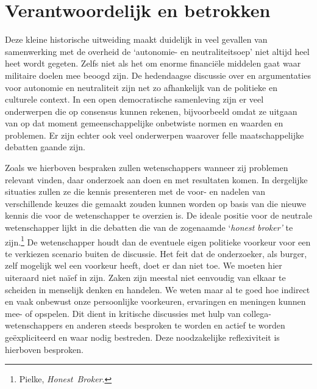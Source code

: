 \documentclass[smallauthor, chapterhaspagenum, nochapterinheader, pagenuminheader,  bigchapnum,medium2, tocpages, garamond, titleinheader]{jote-book}
\begin{document}
	\section{Verantwoordelijk en betrokken}



	Deze kleine historische uitweiding maakt duidelijk in veel gevallen van samenwerking met de overheid de ‘autonomie- en neutraliteitsoep' niet altijd heel heet wordt gegeten. Zelfs niet als het om enorme financiële middelen gaat waar militaire doelen mee beoogd zijn. De hedendaagse discussie over en argumentaties voor autonomie en neutraliteit zijn net zo afhankelijk van de politieke en culturele context. In een open democratische samenleving zijn er veel onderwerpen die op consensus kunnen rekenen, bijvoorbeeld omdat ze uitgaan van op dat moment gemeenschappelijke onbetwiste normen en waarden en problemen. Er zijn echter ook veel onderwerpen waarover felle maatschappelijke debatten gaande zijn.



	Zoals we hierboven bespraken zullen wetenschappers wanneer zij problemen relevant vinden, daar onderzoek aan doen en met resultaten komen. In dergelijke situaties zullen ze die kennis presenteren met de voor- en nadelen van verschillende keuzes die gemaakt zouden kunnen worden op basis van die nieuwe kennis die voor de wetenschapper te overzien is. De ideale positie voor de neutrale wetenschapper lijkt in die debatten die van de zogenaamde ‘\emph{honest}\emph{ broker' }te zijn.\footnote{Pielke, \emph{Honest}\emph{ Broker}.} De wetenschapper houdt dan de eventuele eigen politieke voorkeur voor een te verkiezen scenario buiten de discussie. Het feit dat de onderzoeker, als burger, zelf mogelijk wel een voorkeur heeft, doet er dan niet toe. We moeten hier uiteraard niet naïef in zijn. Zaken zijn meestal niet eenvoudig van elkaar te scheiden in menselijk denken en handelen. We weten maar al te goed hoe indirect en vaak onbewust onze persoonlijke voorkeuren, ervaringen en meningen kunnen mee- of opspelen. Dit dient in kritische discussies met hulp van collega-wetenschappers en anderen steeds besproken te worden en actief te worden geëxpliciteerd en waar nodig bestreden. Deze noodzakelijke reflexiviteit is hierboven besproken.
\end{document}
